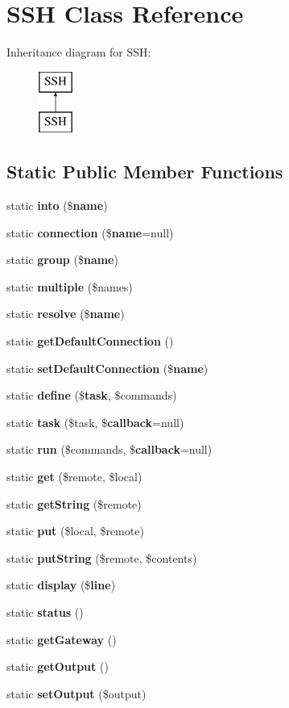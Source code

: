 \section{S\+S\+H Class Reference}
\label{class_s_s_h}
Inheritance diagram for S\+S\+H\+:\begin{figure}[H]
\begin{center}
\leavevmode
\includegraphics[height=2.000000cm]{class_s_s_h}
\end{center}
\end{figure}
\subsection*{Static Public Member Functions}
\begin{DoxyCompactItemize}
\item 
static {\bf into} (\${\bf name})
\item 
static {\bf connection} (\${\bf name}=null)
\item 
static {\bf group} (\${\bf name})
\item 
static {\bf multiple} (\$names)
\item 
static {\bf resolve} (\${\bf name})
\item 
static {\bf get\+Default\+Connection} ()
\item 
static {\bf set\+Default\+Connection} (\${\bf name})
\item 
static {\bf define} (\${\bf task}, \$commands)
\item 
static {\bf task} (\$task, \${\bf callback}=null)
\item 
static {\bf run} (\$commands, \${\bf callback}=null)
\item 
static {\bf get} (\$remote, \$local)
\item 
static {\bf get\+String} (\$remote)
\item 
static {\bf put} (\$local, \$remote)
\item 
static {\bf put\+String} (\$remote, \$contents)
\item 
static {\bf display} (\${\bf line})
\item 
static {\bf status} ()
\item 
static {\bf get\+Gateway} ()
\item 
static {\bf get\+Output} ()
\item 
static {\bf set\+Output} (\$output)
\end{DoxyCompactItemize}


